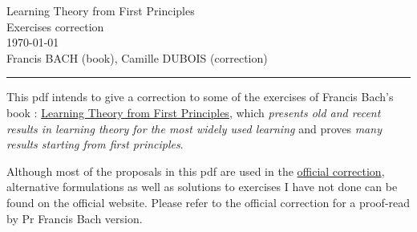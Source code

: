 \documentclass[12pt,letterpaper, onecolumn]{exam}
\begin{document}
\begingroup  
    \centering
    \LARGE Learning Theory from First Principles\\
    \LARGE Exercises correction \\[0.5em]
    \large \today\\[0.5em]
    \large Francis BACH (book), Camille DUBOIS (correction)\par
\endgroup
\rule{\textwidth}{0.4pt}
\pointsdroppedatright   %
\printanswers
\renewcommand{\solutiontitle}{\noindent\textbf{Ans:}\enspace}   %

This pdf intends to give a correction to some of the exercises of Francis Bach's book : \href{https://www.di.ens.fr/%7Efbach/ltfp_book.pdf}{Learning Theory from First Principles}, which \textit{presents old and recent results in learning theory for the most widely used learning} and proves \textit{many results starting from first principles}.

Although most of the proposals in this pdf are used in the \href{https://www.di.ens.fr/~fbach/ltfp_exercises.pdf}{official correction}, alternative formulations as well as solutions to exercises I have not done can be found on the official website. Please refer to the official correction for a proof-read by Pr Francis Bach version.









\end{document}
